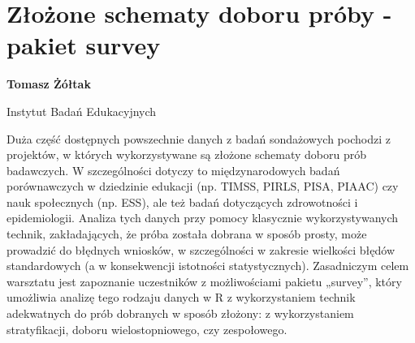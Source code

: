 \documentclass[\main/boa.tex]{subfiles}
\begin{document}
\section{Złożone schematy doboru próby - pakiet survey}

\begin{minipage}{0.915\textwidth}
\centering
{\bf {} Tomasz Żółtak}
\end{minipage}

\vskip 0.3cm

\begin{affiliations}
\begin{minipage}{0.915\textwidth}
\centering
\large Instytut Badań Edukacyjnych  \\[2pt]
\end{minipage}
\end{affiliations}

\vskip 0.8cm

\opiswarsztatu Duża część dostępnych powszechnie danych z badań sondażowych pochodzi z projektów, w których wykorzystywane są złożone schematy doboru prób badawczych. W szczególności dotyczy to międzynarodowych badań porównawczych w dziedzinie edukacji (np. TIMSS, PIRLS, PISA, PIAAC) czy nauk społecznych (np. ESS), ale też badań dotyczących zdrowotności i epidemiologii. Analiza tych danych przy pomocy klasycznie wykorzystywanych technik, zakładających, że próba została dobrana w sposób prosty, może prowadzić do błędnych wniosków, w szczególności w zakresie wielkości błędów standardowych (a w konsekwencji istotności statystycznych). Zasadniczym celem warsztatu jest zapoznanie uczestników z możliwościami pakietu „survey”, który umożliwia analizę tego rodzaju danych w R z wykorzystaniem technik adekwatnych do prób dobranych w sposób złożony: z wykorzystaniem stratyfikacji, doboru wielostopniowego, czy zespołowego.
\end{document}
